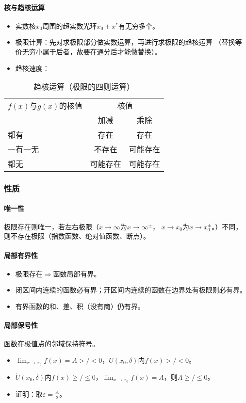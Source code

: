 \documentclass[
12pt, %
a4paper, 
oneside, %
headinclude,footinclude, %
]{scrartcl}
\begin{document}
\paragraph{核与趋核运算}
\begin{itemize}
\item 实数核$ x_0 $周围的超实数光环$ x_0 + x^* $有无穷多个。
\item 极限计算：先对求极限部分做实数运算，再进行求极限的趋核运算
（替换等价无穷小属于后者，故要在通分后才能做替换）。
\item 趋核速度：
\end{itemize}
\begin{table}[hbt]
\caption{趋核运算（极限的四则运算）}
\centering
\begin{tabular}{lcc}
\toprule
$ f(x) $与$ g(x) $的核值 & \multicolumn{2}{c}{核值} \\
\cmidrule(lr){2-3}
& 加减 & 乘除 \\
\midrule
都有 & 存在 & 存在 \\
一有一无 & 不存在 & 可能存在 \\
都无 & 可能存在 & 可能存在 \\
\bottomrule
\end{tabular}
\end{table}
\subsubsection{性质}
\paragraph{唯一性}
极限存在则唯一，若左右极限（$ x \to \infty $为$ x \to \infty^\pm $，
$ x \to x_0 $为$ x \to x_0^\pm $。）不同，则不存在极限（指数函数、绝对值函数、断点）。
\paragraph{局部有界性}
\begin{itemize}
\item 极限存在$ \Rightarrow $函数局部有界。
\item 闭区间内连续的函数必有界；开区间内连续的函数在边界处有极限则必有界。
\item 有界函数的和、差、积（没有商）仍有界。
\end{itemize}
\paragraph{局部保号性}
函数在极值点的邻域保持符号。
\begin{itemize}
\item $ \lim_{x \to x_0} f(x) = A >/< 0 $，$ U(x_0, \delta) $内$ f(x) >/< 0 $。
\item $ \mathring{U}(x_0, \delta) $内$ f(x) \geq /\leq 0$，$ \lim_{x \to x_0} f(x) = A $，则$ A \geq / \leq 0 $。
\item 证明：取$ \varepsilon = \frac{A}{2} $。
\end{itemize}
\end{document}
